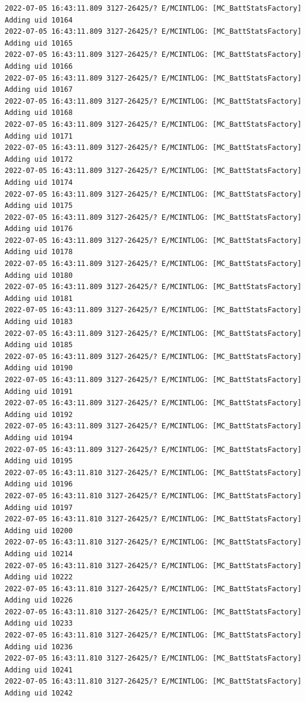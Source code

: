 \documentclass[a4paper,12pt]{book}
\begin{document}
\begin{lstlisting}
2022-07-05 16:43:11.809 3127-26425/? E/MCINTLOG: [MC_BattStatsFactory] Adding uid 10164
2022-07-05 16:43:11.809 3127-26425/? E/MCINTLOG: [MC_BattStatsFactory] Adding uid 10165
2022-07-05 16:43:11.809 3127-26425/? E/MCINTLOG: [MC_BattStatsFactory] Adding uid 10166
2022-07-05 16:43:11.809 3127-26425/? E/MCINTLOG: [MC_BattStatsFactory] Adding uid 10167
2022-07-05 16:43:11.809 3127-26425/? E/MCINTLOG: [MC_BattStatsFactory] Adding uid 10168
2022-07-05 16:43:11.809 3127-26425/? E/MCINTLOG: [MC_BattStatsFactory] Adding uid 10171
2022-07-05 16:43:11.809 3127-26425/? E/MCINTLOG: [MC_BattStatsFactory] Adding uid 10172
2022-07-05 16:43:11.809 3127-26425/? E/MCINTLOG: [MC_BattStatsFactory] Adding uid 10174
2022-07-05 16:43:11.809 3127-26425/? E/MCINTLOG: [MC_BattStatsFactory] Adding uid 10175
2022-07-05 16:43:11.809 3127-26425/? E/MCINTLOG: [MC_BattStatsFactory] Adding uid 10176
2022-07-05 16:43:11.809 3127-26425/? E/MCINTLOG: [MC_BattStatsFactory] Adding uid 10178
2022-07-05 16:43:11.809 3127-26425/? E/MCINTLOG: [MC_BattStatsFactory] Adding uid 10180
2022-07-05 16:43:11.809 3127-26425/? E/MCINTLOG: [MC_BattStatsFactory] Adding uid 10181
2022-07-05 16:43:11.809 3127-26425/? E/MCINTLOG: [MC_BattStatsFactory] Adding uid 10183
2022-07-05 16:43:11.809 3127-26425/? E/MCINTLOG: [MC_BattStatsFactory] Adding uid 10185
2022-07-05 16:43:11.809 3127-26425/? E/MCINTLOG: [MC_BattStatsFactory] Adding uid 10190
2022-07-05 16:43:11.809 3127-26425/? E/MCINTLOG: [MC_BattStatsFactory] Adding uid 10191
2022-07-05 16:43:11.809 3127-26425/? E/MCINTLOG: [MC_BattStatsFactory] Adding uid 10192
2022-07-05 16:43:11.809 3127-26425/? E/MCINTLOG: [MC_BattStatsFactory] Adding uid 10194
2022-07-05 16:43:11.809 3127-26425/? E/MCINTLOG: [MC_BattStatsFactory] Adding uid 10195
2022-07-05 16:43:11.810 3127-26425/? E/MCINTLOG: [MC_BattStatsFactory] Adding uid 10196
2022-07-05 16:43:11.810 3127-26425/? E/MCINTLOG: [MC_BattStatsFactory] Adding uid 10197
2022-07-05 16:43:11.810 3127-26425/? E/MCINTLOG: [MC_BattStatsFactory] Adding uid 10200
2022-07-05 16:43:11.810 3127-26425/? E/MCINTLOG: [MC_BattStatsFactory] Adding uid 10214
2022-07-05 16:43:11.810 3127-26425/? E/MCINTLOG: [MC_BattStatsFactory] Adding uid 10222
2022-07-05 16:43:11.810 3127-26425/? E/MCINTLOG: [MC_BattStatsFactory] Adding uid 10226
2022-07-05 16:43:11.810 3127-26425/? E/MCINTLOG: [MC_BattStatsFactory] Adding uid 10233
2022-07-05 16:43:11.810 3127-26425/? E/MCINTLOG: [MC_BattStatsFactory] Adding uid 10236
2022-07-05 16:43:11.810 3127-26425/? E/MCINTLOG: [MC_BattStatsFactory] Adding uid 10241
2022-07-05 16:43:11.810 3127-26425/? E/MCINTLOG: [MC_BattStatsFactory] Adding uid 10242

\end{lstlisting}
\end{document}
